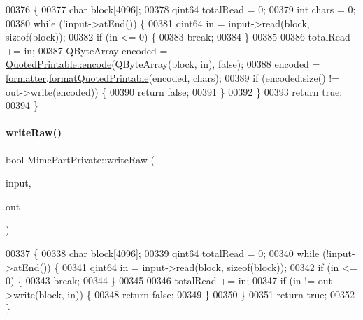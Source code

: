 \begin{DoxyCode}
00376 \{
00377     \textcolor{keywordtype}{char} block[4096];
00378     qint64 totalRead = 0;
00379     \textcolor{keywordtype}{int} chars = 0;
00380     \textcolor{keywordflow}{while} (!input->atEnd()) \{
00381         qint64 in = input->read(block, \textcolor{keyword}{sizeof}(block));
00382         \textcolor{keywordflow}{if} (in <= 0) \{
00383             \textcolor{keywordflow}{break};
00384         \}
00385 
00386         totalRead += in;
00387         QByteArray encoded = \hyperlink{class_simple_mail_1_1_quoted_printable_a8426b74cafe1c93232ac60d3f077c9e8}{QuotedPrintable::encode}(QByteArray(block, in), \textcolor{keyword}{false});
00388         encoded = \hyperlink{class_simple_mail_1_1_mime_part_private_a0a630f148c8e8070c73b60c75e9777a4}{formatter}.\hyperlink{class_simple_mail_1_1_mime_content_formatter_ae1f9eff05be2538bf6b3210fbab4b75a}{formatQuotedPrintable}(encoded, chars);
00389         \textcolor{keywordflow}{if} (encoded.size() != out->write(encoded)) \{
00390             \textcolor{keywordflow}{return} \textcolor{keyword}{false};
00391         \}
00392     \}
00393     \textcolor{keywordflow}{return} \textcolor{keyword}{true};
00394 \}
\end{DoxyCode}
\mbox{\label{class_simple_mail_1_1_mime_part_private_a5409a7f49d4e02b3587ee7b679e62c35}} 
\paragraph{\texorpdfstring{write\+Raw()}{writeRaw()}}
{\footnotesize\ttfamily bool Mime\+Part\+Private\+::write\+Raw (\begin{DoxyParamCaption}\item[{Q\+I\+O\+Device $\ast$}]{input,  }\item[{Q\+I\+O\+Device $\ast$}]{out }\end{DoxyParamCaption})}


\begin{DoxyCode}
00337 \{
00338     \textcolor{keywordtype}{char} block[4096];
00339     qint64 totalRead = 0;
00340     \textcolor{keywordflow}{while} (!input->atEnd()) \{
00341         qint64 in = input->read(block, \textcolor{keyword}{sizeof}(block));
00342         \textcolor{keywordflow}{if} (in <= 0) \{
00343             \textcolor{keywordflow}{break};
00344         \}
00345 
00346         totalRead += in;
00347         \textcolor{keywordflow}{if} (in != out->write(block, in)) \{
00348             \textcolor{keywordflow}{return} \textcolor{keyword}{false};
00349         \}
00350     \}
00351     \textcolor{keywordflow}{return} \textcolor{keyword}{true};
00352 \}
\end{DoxyCode}


